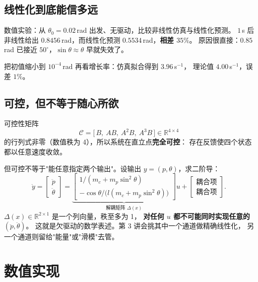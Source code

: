 \subsection{线性化到底能信多远}

数值实验：从 $\theta_0=0.02$\,rad 出发、无驱动，比较非线性仿真与线性化预测。
$1$\,s 后非线性给出 $0.8456$\,rad，而线性化预测 $0.5534$\,rad，\textbf{相差 $35\%$}。
原因很直接：$0.85$\,rad 已接近 $50^\circ$，$\sin\theta\approx\theta$ 早就失效了。

把初值缩小到 $10^{-4}$\,rad 再看增长率：仿真拟合得到 $3.96$\,s$^{-1}$，
理论值 $4.00$\,s$^{-1}$，误差 $1\%$。


\subsection{可控，但不等于随心所欲}

可控性矩阵
\begin{equation}
  \mathcal{C} = \big[\,B,\ AB,\ A^2B,\ A^3B\,\big] \in\mathbb{R}^{4\times4}
\end{equation}
的行列式非零（数值秩为 4），所以系统在直立点\textbf{完全可控}：
存在反馈使四个状态都以任意速度收敛。

但可控不等于"能任意指定两个输出"。设输出 $y=(p,\theta)$，求二阶导：
\begin{equation}
  \ddot y = \begin{bmatrix}\ddot p\\ \ddot\theta\end{bmatrix}
  = \underbrace{\begin{bmatrix} 1/(m_c+m_p\sin^2\theta)\\ -\cos\theta/\big(l(m_c+m_p\sin^2\theta)\big)\end{bmatrix}}_{\text{解耦矩阵 }\Delta(x)} u
  + \begin{bmatrix}\text{耦合项}\\ \text{耦合项}\end{bmatrix}.
\end{equation}
$\Delta(x)\in\mathbb{R}^{2\times1}$ 是一个列向量，秩至多为 1，
\textbf{对任何 $u$ 都不可能同时实现任意的 $(\ddot p,\ddot\theta)$}。
这就是欠驱动的数学表述。第 3 讲会挑其中一个通道做精确线性化，
另一个通道则留给"能量"或"滑模"去管。

\section{数值实现}

